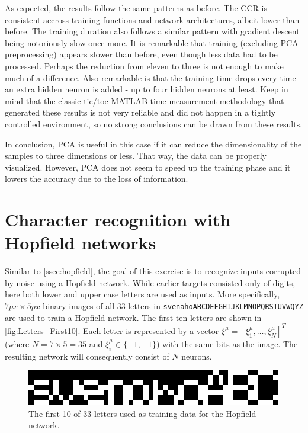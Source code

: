 \documentclass[a4, 10pt, twoside, twocolumn]{article}
\numberwithin{figure}{section}
\begin{document}
As expected, the results follow the same patterns as before. The CCR is consistent accross training functions and network architectures, albeit lower than before. The training duration also follows a similar pattern with gradient descent being notoriously slow once more. It is remarkable that training (excluding PCA preprocessing) appears slower than before, even though less data had to be processed. Perhaps the reduction from eleven to three is not enough to make much of a difference. Also remarkable is that the training time drops every time an extra hidden neuron is added - up to four hidden neurons at least. Keep in mind that the classic tic/toc MATLAB time measurement methodology that generated these results is not very reliable and did not happen in a tightly controlled environment, so no strong conclusions can be drawn from these results.

In conclusion, PCA is useful in this case if it can reduce the dimensionality of the samples to three dimensions or less. That way, the data can be properly visualized. However, PCA does not seem to speed up the training phase and it lowers the accuracy due to the loss of information.


\section{Character recognition with Hopfield networks}

Similar to \autoref{ssec:hopfield}, the goal of this exercise is to recognize inputs corrupted by noise using a Hopfield network. While earlier targets consisted only of digits, here both lower and upper case letters are used as inputs. More specifically, $7px \times 5px$ binary images of all 33 letters in \texttt{svenahoABCDEFGHIJKLMNOPQRSTUVWQYZ} are used to train a Hopfield network. The first ten letters are shown in \autoref{fig:Letters_First10}. Each letter is represented by a vector $\xi^\mu = [\xi_1^\mu, \ldots, \xi_N^\mu]^T$ (where $N=7 \times 5=35$ and $\xi_i^\mu \in \{-1, +1\}$) with the same bits as the image. The resulting network will consequently consist of $N$ neurons.

\begin{figure}[ht]
    \includegraphics[width=\linewidth]{img/Letters_First10.png}
    \caption{The first 10 of 33 letters used as training data for the Hopfield network.}
    \label{fig:Letters_First10}
\end{figure}
\end{document}
